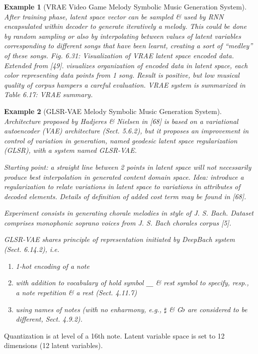 \documentclass{article}
\newtheorem{example}{Example}
\begin{document}
\begin{itemize}
\begin{itemize}
\begin{itemize}
\begin{itemize}
\begin{example}[VRAE Video Game Melody Symbolic Music Generation System]
					After training phase, latent space vector can be sampled \& used by RNN encapsulated within decoder to generate iteratively a melody. This could be done by random sampling or also by interpolating between values of latent variables corresponding to different songs that have been learnt, creating a sort of ``medley'' of these songs. {\sf Fig. 6.31: Visualization of VRAE latent space encoded data. Extended from [49].} visualizes organization of encoded data in latent space, each color representing data points from 1 song. Result is positive, but low musical quality of corpus hampers a careful evaluation. VRAE system is summarized in {\sf Table 6.17: VRAE summary}.
				\end{example}

				\begin{example}[GLSR-VAE Melody Symbolic Music Generation System]
					Architecture proposed by {\sc Hadjeres \& Nielsen} in [68] is based on a variational autoencoder (VAE) architecture (Sect. 5.6.2), but it proposes an improvement in control of variation in generation, named {\it geodesic latent space regularization} (GLSR), with a system named GLSR-VAE.

					Starting point: a straight line between 2 points in latent space will not necessarily produce \emph{best} interpolation in generated content domain space. Idea: introduce a regularization to relate variations in latent space to variations in attributes of decoded elements. Details of definition of added cost term may be found in [68].

					Experiment consists in generating chorale melodies in style of {\sc J. S. Bach}. Dataset comprises monophonic soprano voices from {\sc J. S. Bach} chorales corpus [5].

					GLSR-VAE shares principle of representation initiated by DeepBach system (Sect. 6.14.2), i.e.
					\begin{enumerate}
						\item 1-hot encoding of a note
						\item with addition to vocabulary of hold symbol \verb|__| \& rest symbol to specify, resp., a note repetition \& a rest (Sect. 4.11.7)
						\item using names of notes (with no enharmony, e.g., $\sharp$ \& G$\flat$ are considered to be different, Sect. 4.9.2).
					\end{enumerate}
				\end{example}
				Quantization is at level of a 16th note. Latent variable space is set to 12 dimensions (12 latent variables).


\end{itemize}
\end{itemize}
\end{itemize}
\end{itemize}
\end{document}
